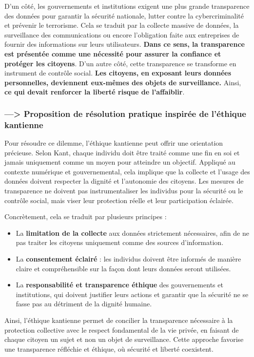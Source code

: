\documentclass[11pt,a4paper]{article}
\begin{document}
D’un côté, les gouvernements et institutions exigent une plus grande transparence des données pour garantir la sécurité nationale, lutter contre la cybercriminalité et prévenir le terrorisme. Cela se traduit par la collecte massive de données, la surveillance des communications ou encore l’obligation faite aux entreprises de fournir des informations sur leurs utilisateurs. \textbf{Dans ce sens, la transparence est présentée comme une nécessité pour assurer la confiance et protéger les citoyens}. D’un autre côté, cette transparence se transforme en instrument de contrôle social. \textbf{Les citoyens, en exposant leurs données personnelles, deviennent eux-mêmes des objets de surveillance.} Ainsi, \textbf{ce qui devait renforcer la liberté  risque de l’affaiblir}.

\subsubsection{---> Proposition de résolution pratique inspirée de l’éthique kantienne}
Pour résoudre ce dilemme, l’éthique kantienne peut offrir une orientation précieuse. Selon Kant, chaque individu doit être traité comme une fin en soi et jamais uniquement comme un moyen pour atteindre un objectif. Appliqué au contexte numérique et gouvernemental, cela implique que la collecte et l’usage des données doivent respecter la dignité et l’autonomie des citoyens. Les mesures de transparence ne doivent pas instrumentaliser les individus pour la sécurité ou le contrôle social, mais viser leur protection réelle et leur participation éclairée.

Concrètement, cela se traduit par plusieurs principes :
\begin{itemize}
\item La \textbf{limitation de la collecte} aux données strictement nécessaires, afin de ne pas traiter les citoyens uniquement comme des sources d’information.
\item La \textbf{consentement éclairé} : les individus doivent être informés de manière claire et compréhensible sur la façon dont leurs données seront utilisées.
\item La \textbf{responsabilité et transparence éthique} des gouvernements et institutions, qui doivent justifier leurs actions et garantir que la sécurité ne se fasse pas au détriment de la dignité humaine.
\end{itemize}

Ainsi, l’éthique kantienne permet de concilier la transparence nécessaire à la protection collective avec le respect fondamental de la vie privée, en faisant de chaque citoyen un sujet et non un objet de surveillance. Cette approche favorise une transparence réfléchie et éthique, où sécurité et liberté coexistent.
\end{document}
